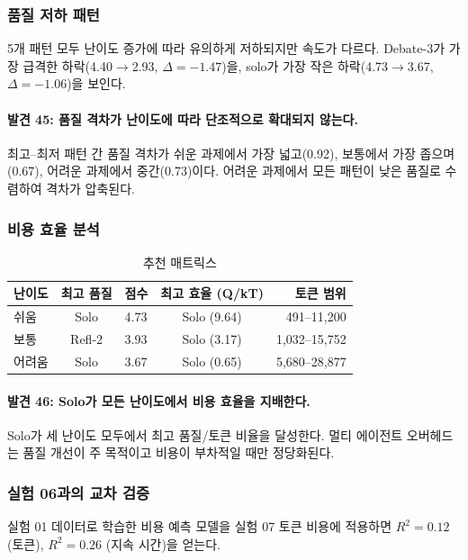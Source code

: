 \subsubsection{품질 저하 패턴}

5개 패턴 모두 난이도 증가에 따라 유의하게 저하되지만 속도가 다르다. Debate-3가 가장 급격한 하락(4.40$\to$2.93, $\Delta=-1.47$)을, solo가 가장 작은 하락(4.73$\to$3.67, $\Delta=-1.06$)을 보인다.

\paragraph{발견 45: 품질 격차가 난이도에 따라 단조적으로 확대되지 않는다.}
최고--최저 패턴 간 품질 격차가 쉬운 과제에서 가장 넓고(0.92), 보통에서 가장 좁으며(0.67), 어려운 과제에서 중간(0.73)이다. 어려운 과제에서 모든 패턴이 낮은 품질로 수렴하여 격차가 압축된다.

\subsubsection{비용 효율 분석}

\begin{table}[H]
\centering
\caption{추천 매트릭스}
\label{tab:recommendation-matrix}
{\small
\begin{tabular}{lclcr}
\toprule
난이도 & 최고 품질 & 점수 & 최고 효율 (Q/kT) & 토큰 범위 \\
\midrule
쉬움   & Solo   & 4.73 & Solo (9.64) & 491--11,200 \\
보통   & Refl-2 & 3.93 & Solo (3.17) & 1,032--15,752 \\
어려움 & Solo   & 3.67 & Solo (0.65) & 5,680--28,877 \\
\bottomrule
\end{tabular}
}
\end{table}

\paragraph{발견 46: Solo가 모든 난이도에서 비용 효율을 지배한다.}
Solo가 세 난이도 모두에서 최고 품질/토큰 비율을 달성한다. 멀티 에이전트 오버헤드는 품질 개선이 주 목적이고 비용이 부차적일 때만 정당화된다.

\subsubsection{실험 06과의 교차 검증}

실험 01 데이터로 학습한 비용 예측 모델을 실험 07 토큰 비용에 적용하면 $R^{2}=0.12$ (토큰), $R^{2}=0.26$ (지속 시간)을 얻는다.

